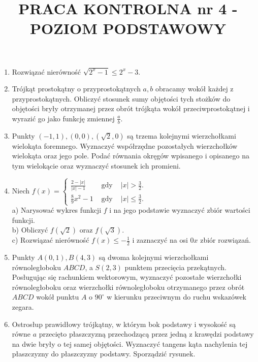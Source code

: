 \documentclass[10pt]{article}
\title{PRACA KONTROLNA nr 4 - POZIOM PODSTAWOWY }
\author{}
\date{}
\begin{document}
\maketitle
\begin{enumerate}
  \item Rozwiązać nierówność $\sqrt{2^{x}-1} \leqslant 2^{x}-3$.
  \item Trójkąt prostokątny o przyprostokątnych $a, b$ obracamy wokół każdej z przyprostokątnych. Obliczyć stosunek sumy objętości tych stożków do objętości bryły otrzymanej przez obrót trójkąta wokół przeciwprostokątnej i wyrazić go jako funkcję zmiennej $\frac{a}{b}$.
  \item Punkty $(-1,1),(0,0),(\sqrt{2}, 0)$ są trzema kolejnymi wierzchołkami wielokąta foremnego. Wyznaczyć współrzędne pozostałych wierzchołków wielokąta oraz jego pole. Podać równania okręgów wpisanego i opisanego na tym wielokącie oraz wyznaczyć stosunek ich promieni.
  \item Niech $f(x)=\left\{\begin{array}{rll}\frac{2-|x|}{|x|-1} & \text { gdy } & |x|>\frac{3}{2} . \\ \frac{8}{9} x^{2}-1 & \text { gdy } & |x| \leqslant \frac{3}{2} .\end{array}\right.$\\
a) Narysować wykres funkcji $f$ i na jego podstawie wyznaczyć zbiór wartości funkcji.\\
b) Obliczyć $f(\sqrt{2})$ oraz $f(\sqrt{3})$.\\
c) Rozwiązać nierówność $f(x) \leqslant-\frac{1}{2}$ i zaznaczyć na osi $0 x$ zbiór rozwiązań.
  \item Punkty $A(0,1), B(4,3)$ są dwoma kolejnymi wierzchołkami równoległoboku $A B C D$, a $S(2,3)$ punktem przecięcia przekątnych. Posługując się rachunkiem wektorowym, wyznaczyć pozostałe wierzchołki równoległoboku oraz wierzchołki równoległoboku otrzymanego przez obrót $A B C D$ wokół punktu $A$ o $90^{\circ}$ w kierunku przeciwnym do ruchu wskazówek zegara.
  \item Ostrosłup prawidłowy trójkątny, w którym bok podstawy i wysokość są równe $a$ przecięto płaszczyzną przechodzącą przez jedną z krawędzi podstawy na dwie bryły o tej samej objętości. Wyznaczyć tangens kąta nachylenia tej płaszczyzny do płaszczyzny podstawy. Sporządzić rysunek.
\end{enumerate}
\end{document}
